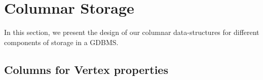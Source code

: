\chapter{Columnar Storage}
\label{columnar-storage}

In this section, we present the design of our columnar data-structures for different components of storage in a GDBMS. 

\section{Columns for Vertex properties}
  
